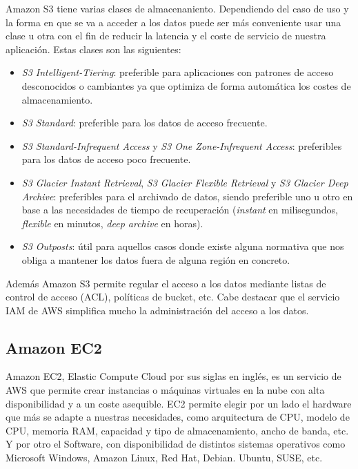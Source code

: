 Amazon S3 tiene varias clases de almacenaniento. Dependiendo del caso de uso y la forma en que se va a acceder a los datos puede ser más conveniente usar una clase u otra con el fin de reducir la latencia y el coste de servicio de nuestra aplicación. Estas clases son las siguientes:
\begin{itemize}
    \item \textit{S3 Intelligent-Tiering}: preferible para aplicaciones con patrones de acceso desconocidos o cambiantes ya que optimiza de forma automática los costes de almacenamiento.
    \item \textit{S3 Standard}: preferible para los datos de acceso frecuente.
    \item \textit{S3 Standard-Infrequent Access} y \textit{S3 One Zone-Infrequent Access}: preferibles para los datos de acceso poco frecuente.
    \item \textit{S3 Glacier Instant Retrieval}, \textit{S3 Glacier Flexible Retrieval} y \textit{S3 Glacier Deep Archive}: preferibles para el archivado de datos, siendo preferible uno u otro en base a las necesidades de tiempo de recuperación (\textit{instant} en milisegundos, \textit{flexible} en minutos, \textit{deep archive} en horas).
    \item \textit{S3 Outposts}: útil para aquellos casos donde existe alguna normativa que nos obliga a mantener los datos fuera de alguna región en concreto.
\end{itemize}

Además Amazon S3 permite regular el acceso a los datos mediante listas de control de acceso (ACL), políticas de bucket, etc. Cabe destacar que el servicio IAM de AWS simplifica mucho la administración del acceso a los datos.

\subsection{Amazon EC2}

Amazon EC2, Elastic Compute Cloud por sus siglas en inglés, es un servicio de AWS que permite crear instancias o máquinas virtuales en la nube con alta disponibilidad y a un coste asequible. EC2 permite elegir por un lado el hardware que más se adapte a nuestras necesidades, como arquitectura de CPU, modelo de CPU, memoria RAM, capacidad y tipo de almacenamiento, ancho de banda, etc. Y por otro el Software, con disponibilidad de distintos sistemas operativos como Microsoft Windows, Amazon Linux, Red Hat, Debian. Ubuntu, SUSE, etc.

